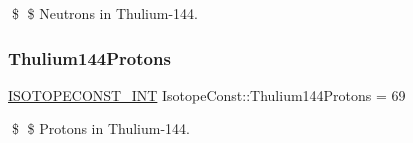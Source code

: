 \$ \$ Neutrons in Thulium-\/144. \mbox{\label{group___isotope_const-_thulium-_tm144_gaf5cfd47f93ce27e3a4d6cb7873d6cca9}} 
\subsubsection{\texorpdfstring{Thulium144\+Protons}{Thulium144Protons}}
{\footnotesize\ttfamily \mbox{\hyperlink{group___isotope_const-_macros_ga5f18360b3e99483a35c32d789e62621c}{I\+S\+O\+T\+O\+P\+E\+C\+O\+N\+S\+T\+\_\+\+I\+NT}} Isotope\+Const\+::\+Thulium144\+Protons = 69}

\$ \$ Protons in Thulium-\/144. 